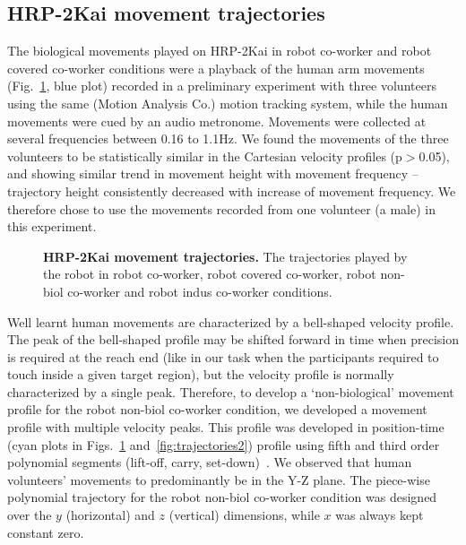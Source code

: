 \documentclass[a4paper, 12pt, oneside]{Thesis}  %
\begin{document}
\subsection{HRP-2Kai movement trajectories} \label{HRP2_Traj}


The biological movements played on HRP-2Kai in robot co-worker and robot covered co-worker conditions were a playback of the human arm movements (Fig.~\ref{fig:trajectories}, blue plot) recorded in a preliminary experiment with three volunteers using the same (Motion Analysis Co.) motion tracking system, while the human movements were cued by an audio metronome. Movements were collected at several frequencies between 0.16 to 1.1Hz. We found the movements of the three volunteers to be statistically similar in the Cartesian velocity profiles (p$>$0.05), and showing similar trend in movement height with movement frequency --trajectory height consistently decreased with increase of movement frequency. We therefore chose to use the movements recorded from one volunteer (a male) in this experiment.


\begin{figure}[hpt]
	\caption{{\bf HRP-2Kai movement trajectories.} The trajectories played by the robot in robot co-worker, robot covered co-worker, robot non-biol co-worker and robot indus co-worker conditions.}
	\label{fig:trajectories}
\end{figure}


Well learnt human movements are characterized by a bell-shaped velocity profile. The peak of the bell-shaped profile may be shifted forward in time when precision is required at the reach end (like in our task when the participants required to touch inside a given target region), but the velocity profile is normally characterized by a single peak. Therefore, to develop a `non-biological' movement profile for the robot non-biol co-worker condition, we developed a movement profile with multiple velocity peaks. This profile was developed in position-time (cyan plots in Figs.~\ref{fig:trajectories} and~\ref{fig:trajectories2}) profile using fifth and third order polynomial segments (lift-off, carry, set-down)~\cite{Biagiotti:Springer:2008}. We observed that human volunteers' movements to predominantly be in the Y-Z plane. The piece-wise polynomial trajectory for the robot non-biol co-worker condition was designed over the $y$ (horizontal) and $z$ (vertical) dimensions, while $x$ was always kept constant zero.
\end{document}
